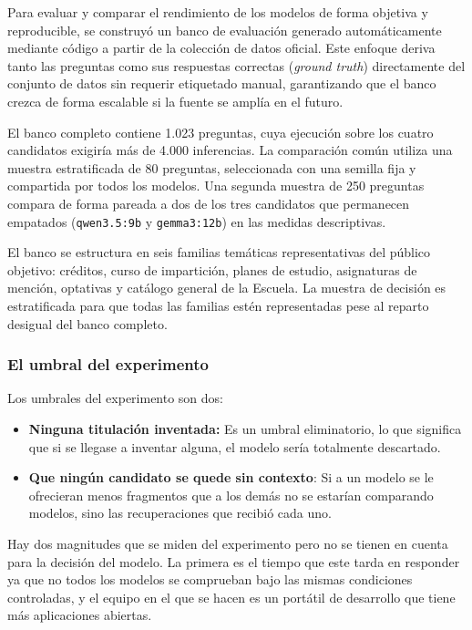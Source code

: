 Para evaluar y comparar el rendimiento de los modelos de forma objetiva y reproducible, se construyó un banco de evaluación generado automáticamente mediante código a partir de la colección de datos oficial. Este enfoque deriva tanto las preguntas como sus respuestas correctas (\textit{ground truth}) directamente del conjunto de datos sin requerir etiquetado manual, garantizando que el banco crezca de forma escalable si la fuente se amplía en el futuro.

El banco completo contiene 1.023 preguntas, cuya ejecución sobre los cuatro candidatos exigiría más de 4.000 inferencias. La comparación común utiliza una muestra estratificada de 80 preguntas, seleccionada con una semilla fija y compartida por todos los modelos. Una segunda muestra de 250 preguntas compara de forma pareada a dos de los tres candidatos que permanecen empatados (\texttt{qwen3.5:9b} y \texttt{gemma3:12b}) en las medidas descriptivas.

El banco se estructura en seis familias temáticas representativas del público objetivo: créditos, curso de impartición, planes de estudio, asignaturas de mención, optativas y catálogo general de la Escuela. La muestra de decisión es estratificada para que todas las familias estén representadas pese al reparto desigual del banco completo.


\subsubsection{El umbral del experimento}

Los umbrales del experimento son dos:

\begin{itemize}
  \item \textbf{Ninguna titulación inventada: }Es un umbral eliminatorio, lo que significa que si se llegase a inventar alguna, el modelo sería totalmente descartado.
  \item \textbf{Que ningún candidato se quede sin contexto}: Si a un modelo se le ofrecieran menos fragmentos que a los demás no se estarían comparando modelos, sino las recuperaciones que recibió cada uno.
\end{itemize}

Hay dos magnitudes que se miden del experimento pero no se tienen en cuenta para la decisión del modelo. La primera es el tiempo que este tarda en responder ya que no todos los modelos se comprueban bajo las mismas condiciones controladas, y el equipo en el que se hacen es un portátil de desarrollo que tiene más aplicaciones abiertas. 

